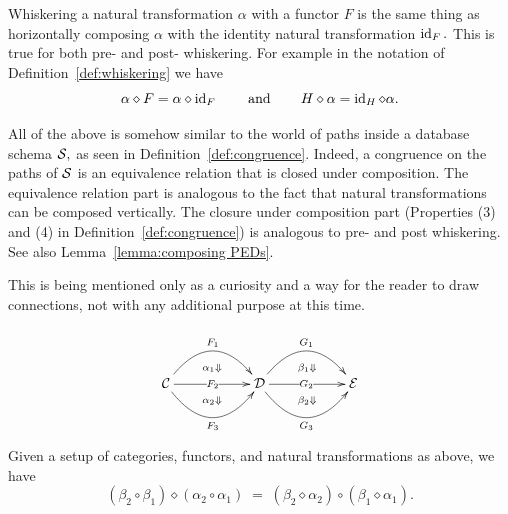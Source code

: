\documentclass[../main/CT4S-EN-RU]{subfiles}
\begin{document}
\begin{definitionRUS}\label{def:horizontal comp of nt}
\end{definitionRUS}

\begin{remarkENG}
Whiskering a natural transformation $\alpha$ with a functor $F$ is the same thing as horizontally composing $\alpha$ with the identity natural transformation $\operatorname{id}_F.$ This is true for both pre- and post- whiskering. For example in the notation of Definition~\ref{def:whiskering} we have 
$$\alpha\diamond F = \alpha\diamond\operatorname{id}_F\hspace{.3in}\textnormal{and}\hspace{.3in} H\diamond\alpha=\operatorname{id}_H\diamond\alpha.$$
\end{remarkENG}

\begin{remarkRUS}
\end{remarkRUS}

\begin{remarkENG}
All of the above is somehow similar to the world of paths inside a database schema $\mathcal{S},$ as seen in Definition~\ref{def:congruence}. Indeed, a congruence on the paths of $\mathcal{S}$ is an equivalence relation that is closed under composition. The equivalence relation part is analogous to the fact that natural transformations can be composed vertically. The closure under composition part (Properties (3) and (4) in Definition~\ref{def:congruence}) is analogous to pre- and post whiskering. See also Lemma~\ref{lemma:composing PEDs}. 

This is being mentioned only as a curiosity and a way for the reader to draw connections, not with any additional purpose at this time.
\end{remarkENG}

\begin{remarkRUS}
\end{remarkRUS}

\begin{theoremENG}
$$
\xymatrix{
&\ar@{}[d]|(.65){\alpha_1\Down}&&\ar@{}[d]|(.65){\beta_1\Down}\\
\mcC\ar@/^2pc/[rr]^{F_1}\ar[rr]|{F_2}\ar@/_2pc/[rr]_{F_3}&&\mcD\ar@/^2pc/[rr]^{G_1}\ar[rr]|{G_2}\ar@/_2pc/[rr]_{G_3}&&\mcE\\
&\ar@{}[u]|(.65){\alpha_2\Down}&&\ar@{}[u]|(.65){\beta_2\Down}}
$$
Given a setup of categories, functors, and natural transformations as above, we have
$$(\beta_2\circ\beta_1)\diamond(\alpha_2\circ\alpha_1)\;=\;(\beta_2\diamond\alpha_2)\circ(\beta_1\diamond\alpha_1).$$
\end{theoremENG}
\end{document}
